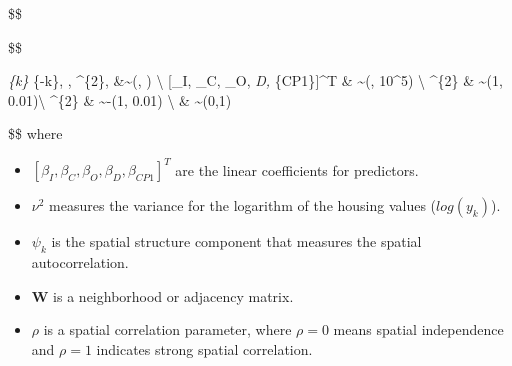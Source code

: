 \documentclass[
]{article}
\providecommand{\tightlist}{%
  \setlength{\itemsep}{0pt}\setlength{\parskip}{0pt}}
\begin{document}
\$\$

\$\$

\psi\emph{\{k\} \mid \psi}\{-k\}, , \tau\^{}\{2\},
\rho \&\sim {}\left(,
\right)
\textbackslash{} {[}\beta\_I, \beta\_C, \beta\_O, \beta\emph{D,
\beta}\{CP1\}{]}\^{}T \& \sim {}\left(,
10\^{}5\right) \textbackslash{} \nu\^{}\{2\} \&
\sim {}(1, 0.01)\textbackslash{} \tau\^{}\{2\}
\& \sim {}-(1, 0.01)
\textbackslash{} \rho \& \sim {}(0,1)

\$\$ where

\begin{itemize}
\tightlist
\item
  \([\beta_I, \beta_C, \beta_O, \beta_D, \beta_{CP1}]^T\) are the linear
  coefficients for predictors.
\item
  \(\nu^2\) measures the variance for the logarithm of the housing
  values (\(log(y_k)\)).
\item
  \(\psi_k\) is the spatial structure component that measures the
  spatial autocorrelation.
\item
  \(\mathbf{W}\) is a neighborhood or adjacency matrix.
\item
  \(\rho\) is a spatial correlation parameter, where \(\rho=0\) means
  spatial independence and \(\rho=1\) indicates strong spatial
  correlation.
\end{itemize}
\end{document}
